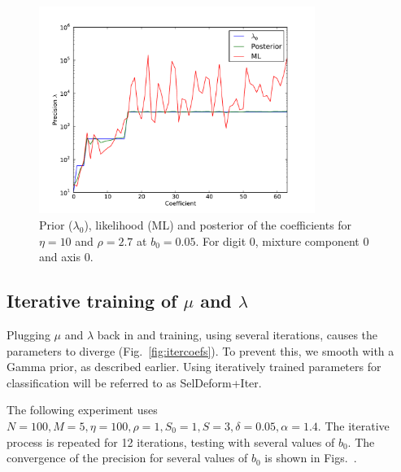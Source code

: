\documentclass{article}
\begin{document}
\begin{figure}
    \centering
    \includegraphics[width=0.8\textwidth]{figs/plotb000-eta10-rho2-7.pdf}
    \caption{Prior ($\lambda_0$), likelihood (ML) and posterior of the coefficients for $\eta=10$ and $\rho=2.7$ at $b_0 = 0.05$. For digit 0, mixture component 0 and axis 0.} \label{fig:rho27}
\end{figure}


\subsection{Iterative training of $\mu$ and $\lambda$}
Plugging $\mu$ and $\lambda$ back in and training, using several iterations, causes the parameters to diverge (Fig.~\ref{fig:itercoefs}). To prevent this, we smooth with a Gamma prior, as described earlier. Using iteratively trained parameters for classification will be referred to as SelDeform+Iter.

The following experiment uses $N=100, M=5, \eta=100, \rho=1, S_0=1, S=3, \delta=0.05, \alpha=1.4$. The iterative process is repeated for 12 iterations, testing with several values of $b_0$. The convergence of the precision for several values of $b_0$ is shown in Figs.~.
\end{document}
